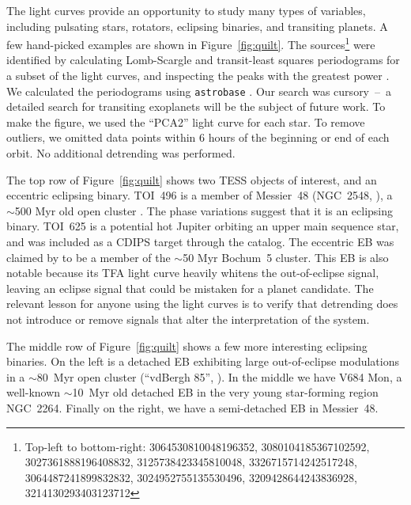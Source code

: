 \documentclass[12pt,twocolumn,tighten,trackchanges]{aastex62}
\begin{document}
The light curves provide an opportunity to study many types of
variables, including pulsating stars, rotators, eclipsing binaries,
and transiting planets.  A few hand-picked examples are shown in
Figure~\ref{fig:quilt}.
The sources\footnote{
	Top-left to bottom-right:
	3064530810048196352, 
	3080104185367102592, 
	3027361888196408832,
	3125738423345810048,
	3326715714242517248,
	3064487241899832832,
	3024952755135530496,
  3209428644243836928,
  3214130293403123712 
} were identified by calculating Lomb-Scargle and transit-least
squares periodograms for a subset of the light curves, and inspecting
the peaks with the greatest power
\citep{lomb_1976,scargle_studies_1982,kovacs_box-fitting_2002,vanderplas_periodograms_2015,hippke_TLS_2019}.
We calculated the periodograms using \texttt{astrobase}
\citep{bhatti_astrobase_2018}.  Our search was cursory~--~a detailed
search for transiting exoplanets will be the subject of future work.
To make the figure, we used the ``PCA2'' light curve for each star.
To remove outliers, we omitted data points within 6 hours of the
beginning or end of each orbit.  No additional detrending was
performed.

The top row of Figure~\ref{fig:quilt} shows two TESS objects of
interest, and an eccentric eclipsing binary.  TOI~496 is a member of
Messier~48 (NGC~2548,
\citealt{gaia_collaboration_gaia_2018,cantat-gaudin_gaia_2018}), a
$\sim$500 Myr old open cluster \citep{Kharchenko_et_al_2013}.  The
phase variations suggest that it is an eclipsing binary.  TOI~625 is a
potential hot Jupiter orbiting an upper main sequence star, and was
included as a CDIPS target through the \citet{zari_3d_2018} catalog.
The eccentric EB was claimed by \citet{dias_proper_2014} to be a
member of the $\sim$50 Myr Bochum~5 cluster.  This EB is also notable
because its TFA light curve heavily whitens the out-of-eclipse signal,
leaving an eclipse signal that could be mistaken for a planet
candidate.  The relevant lesson for anyone using the light curves is
to verify that detrending does not introduce or remove signals that
alter the interpretation of the system.

The middle row of Figure~\ref{fig:quilt} shows a few more interesting
eclipsing binaries.  On the left is a detached EB exhibiting large
out-of-eclipse modulations in a $\sim$80~Myr open cluster (``vdBergh
85'', \citealt{Kharchenko_et_al_2013}).  In the middle we have V684
Mon, a well-known $\sim$10~Myr old detached EB in the very young
star-forming region NGC~2264.  Finally on the right, we have a
semi-detached EB in Messier~48.
\end{document}
